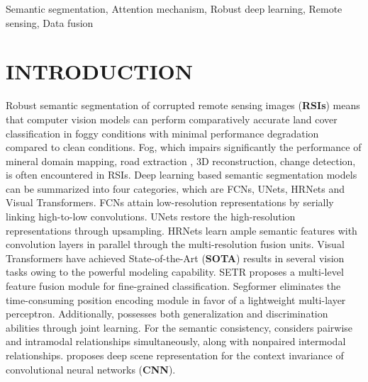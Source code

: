 \documentclass[lettersize,journal]{IEEEtran}
\begin{document}
\begin{IEEEkeywords}
Semantic segmentation, Attention mechanism, Robust deep learning, Remote sensing, Data fusion
\end{IEEEkeywords}

\section{INTRODUCTION}

Robust semantic segmentation of corrupted remote sensing images (\textbf{RSIs}) means that computer vision models can perform comparatively accurate land cover classification in foggy conditions with minimal performance degradation compared to clean conditions. Fog, which impairs significantly the performance of mineral domain mapping\cite{Lorenz2021FeatureEF}, road extraction \cite{8922802}, 3D reconstruction\cite{9229514}, change detection\cite{6244846}, is often encountered in RSIs. Deep learning based semantic segmentation  models can be summarized into four categories, which are FCNs\cite{shelhamerFullyConvolutionalNetworks2017}, UNets\cite{ronnebergerUNetConvolutionalNetworks2015}, HRNets\cite{wangDeepHighResolutionRepresentation2020} and Visual Transformers\cite{Zheng2021RethinkingSS}. FCNs attain low-resolution representations by serially linking high-to-low convolutions. UNets restore the high-resolution representations through upsampling. HRNets learn ample semantic features with convolution layers in parallel through the multi-resolution fusion units. Visual Transformers have achieved State-of-the-Art (\textbf{SOTA}) results in several vision tasks owing to the powerful modeling capability. SETR\cite{Zheng2021RethinkingSS} proposes a multi-level feature fusion module for fine-grained classification. Segformer\cite{xieSegFormerSimpleEfficient2021} eliminates the time-consuming position encoding module in favor of a lightweight multi-layer perceptron. Additionally,\cite{Zheng2022GeneralizedSC}  possesses both generalization and discrimination abilities through joint learning. For the semantic consistency,\cite{Ning2022SemanticsConsistentRL} considers pairwise and intramodal relationships simultaneously, along with nonpaired intermodal relationships. \cite{Zheng2019ADS} proposes deep scene representation for the context invariance of convolutional neural networks (\textbf{CNN}). 
\end{document}
